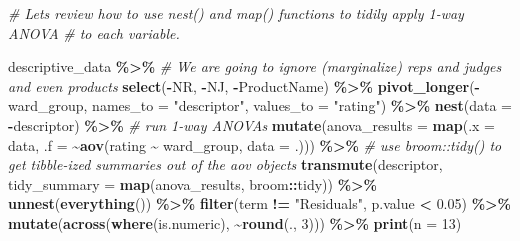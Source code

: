 \documentclass[
]{book}
\newenvironment{Shaded}{\begin{snugshade}}{\end{snugshade}}
\newcommand{\AttributeTok}[1]{\textcolor[rgb]{0.13,0.29,0.53}{#1}}
\newcommand{\CommentTok}[1]{\textcolor[rgb]{0.56,0.35,0.01}{\textit{#1}}}
\newcommand{\DecValTok}[1]{\textcolor[rgb]{0.00,0.00,0.81}{#1}}
\newcommand{\FloatTok}[1]{\textcolor[rgb]{0.00,0.00,0.81}{#1}}
\newcommand{\FunctionTok}[1]{\textcolor[rgb]{0.13,0.29,0.53}{\textbf{#1}}}
\newcommand{\NormalTok}[1]{#1}
\newcommand{\SpecialCharTok}[1]{\textcolor[rgb]{0.81,0.36,0.00}{\textbf{#1}}}
\newcommand{\StringTok}[1]{\textcolor[rgb]{0.31,0.60,0.02}{#1}}
\begin{document}
\begin{Shaded}
\begin{Highlighting}[]
\CommentTok{\# Let\textquotesingle{}s review how to use nest() and map() functions to tidily apply 1{-}way ANOVA}
\CommentTok{\# to each variable.}

\NormalTok{descriptive\_data }\SpecialCharTok{\%\textgreater{}\%}
  \CommentTok{\# We are going to ignore (marginalize) reps and judges and even products}
  \FunctionTok{select}\NormalTok{(}\SpecialCharTok{{-}}\NormalTok{NR, }\SpecialCharTok{{-}}\NormalTok{NJ, }\SpecialCharTok{{-}}\NormalTok{ProductName) }\SpecialCharTok{\%\textgreater{}\%}
  \FunctionTok{pivot\_longer}\NormalTok{(}\SpecialCharTok{{-}}\NormalTok{ward\_group,}
               \AttributeTok{names\_to =} \StringTok{"descriptor"}\NormalTok{,}
               \AttributeTok{values\_to =} \StringTok{"rating"}\NormalTok{) }\SpecialCharTok{\%\textgreater{}\%}
  \FunctionTok{nest}\NormalTok{(}\AttributeTok{data =} \SpecialCharTok{{-}}\NormalTok{descriptor) }\SpecialCharTok{\%\textgreater{}\%}
  \CommentTok{\# run 1{-}way ANOVAs}
  \FunctionTok{mutate}\NormalTok{(}\AttributeTok{anova\_results =} \FunctionTok{map}\NormalTok{(}\AttributeTok{.x =}\NormalTok{ data,}
                             \AttributeTok{.f =} \SpecialCharTok{\textasciitilde{}}\FunctionTok{aov}\NormalTok{(rating }\SpecialCharTok{\textasciitilde{}}\NormalTok{ ward\_group, }\AttributeTok{data =}\NormalTok{ .))) }\SpecialCharTok{\%\textgreater{}\%}
  \CommentTok{\# use broom::tidy() to get tibble{-}ized summaries out of the \textasciigrave{}aov\textasciigrave{} objects}
  \FunctionTok{transmute}\NormalTok{(descriptor,}
            \AttributeTok{tidy\_summary =} \FunctionTok{map}\NormalTok{(anova\_results, broom}\SpecialCharTok{::}\NormalTok{tidy)) }\SpecialCharTok{\%\textgreater{}\%}
  \FunctionTok{unnest}\NormalTok{(}\FunctionTok{everything}\NormalTok{()) }\SpecialCharTok{\%\textgreater{}\%}
  \FunctionTok{filter}\NormalTok{(term  }\SpecialCharTok{!=} \StringTok{"Residuals"}\NormalTok{,}
\NormalTok{         p.value }\SpecialCharTok{\textless{}} \FloatTok{0.05}\NormalTok{) }\SpecialCharTok{\%\textgreater{}\%}
  \FunctionTok{mutate}\NormalTok{(}\FunctionTok{across}\NormalTok{(}\FunctionTok{where}\NormalTok{(is.numeric), }\SpecialCharTok{\textasciitilde{}}\FunctionTok{round}\NormalTok{(., }\DecValTok{3}\NormalTok{))) }\SpecialCharTok{\%\textgreater{}\%}
  \FunctionTok{print}\NormalTok{(}\AttributeTok{n =} \DecValTok{13}\NormalTok{)}
\end{Highlighting}
\end{Shaded}
\end{document}
